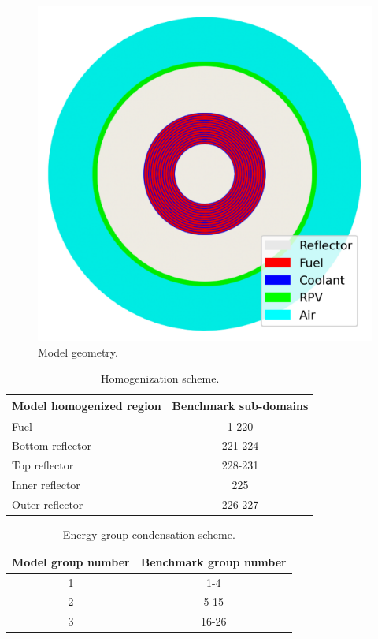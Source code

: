 \begin{figure}[htbp!]
  \centering
  \includegraphics[width=0.45\linewidth]{figures-thermal/ex3-mesh}
  \hfill
  \caption{Model geometry.}
  \label{fig:coupled-mesh}
\end{figure}

\begin{table}[htbp!]
\centering
      \caption{Homogenization scheme.}
      \label{tab:coupled-rz}
    \begin{tabular}{l c}
  \toprule
  Model homogenized region & Benchmark sub-domains \\
  \midrule
  Fuel               & 1-220   \\
  Bottom reflector   & 221-224 \\
  Top reflector      & 228-231 \\
  Inner reflector    & 225     \\
  Outer reflector    & 226-227 \\
  \bottomrule
  \end{tabular}
\end{table}

\begin{table}[htbp!]
\centering
      \caption{Energy group condensation scheme.}
      \label{tab:coupled-eg}
    \begin{tabular}{c c}
  \toprule
  Model group number & Benchmark group number \\
  \midrule
  1 & 1-4   \\
  2 & 5-15  \\
  3 & 16-26 \\
  \bottomrule
  \end{tabular}
\end{table}

